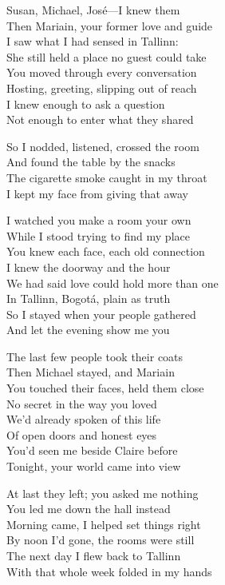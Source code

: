 \begin{lyrics}
Susan, Michael, José—I knew them\\
Then Mariain, your former love and guide\\
I saw what I had sensed in Tallinn:\\
She still held a place no guest could take\\
You moved through every conversation\\
Hosting, greeting, slipping out of reach\\
I knew enough to ask a question\\
Not enough to enter what they shared

So I nodded, listened, crossed the room\\
And found the table by the snacks\\
The cigarette smoke caught in my throat\\
I kept my face from giving that away

I watched you make a room your own\\
While I stood trying to find my place\\
You knew each face, each old connection\\
I knew the doorway and the hour\\
We had said love could hold more than one\\
In Tallinn, Bogotá, plain as truth\\
So I stayed when your people gathered\\
And let the evening show me you

The last few people took their coats\\
Then Michael stayed, and Mariain\\
You touched their faces, held them close\\
No secret in the way you loved\\
We’d already spoken of this life\\
Of open doors and honest eyes\\
You’d seen me beside Claire before\\
Tonight, your world came into view

At last they left; you asked me nothing\\
You led me down the hall instead\\
Morning came, I helped set things right\\
By noon I’d gone, the rooms were still\\
The next day I flew back to Tallinn\\
With that whole week folded in my hands
\end{lyrics}

